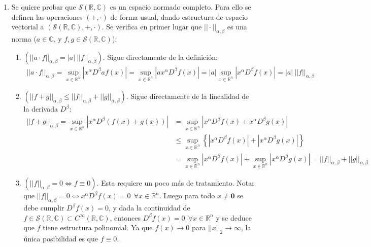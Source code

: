 \documentclass[spanish, fleqn]{article}
\begin{document}
\begin{description}
\begin{enumerate}
		\item Se quiere probar que $\mathcal{S}(\mathbb{R},\mathbb{C})$ es un espacio normado completo. Para ello se definen las operaciones $(+,\cdot)$ de forma usual, dando estructura de espacio vectorial a $\displaystyle \left(\mathcal{S}(\mathbb{R},\mathbb{C}),+,\cdot \right)$. Se verifica en primer lugar que $||\cdot||_{\alpha,\beta}$ es una norma ($a \in \mathbb{C}$, y $f,g \in \mathcal{S}(\mathbb{R},\mathbb{C})$): 
		\begin{enumerate}
			\item $\left( ||a \cdot f||_{\alpha,\beta} = |a| \ ||f||_{\alpha,\beta} \right)$. Sigue directamente de la definición:
			\begin{align*}
				||a \cdot f||_{\alpha,\beta} = \sup_{x \in \mathbb{R}^n} \left| x^{\alpha} D^{\beta} a f(x) \right| = \sup_{x \in \mathbb{R}^n} \left| a x^{\alpha} D^{\beta} f(x) \right| = |a| \sup_{x \in \mathbb{R}^n} \left| x^{\alpha} D^{\beta} f(x) \right| = |a| \ ||f||_{\alpha,\beta} 
			\end{align*}
			\item $\left( ||f+g||_{\alpha,\beta} \leq ||f||_{\alpha,\beta} + ||g||_{\alpha,\beta }\right)$. Sigue directamente de la linealidad de la derivada $D^{\beta}$:
			\begin{align*}
				 ||f+g||_{\alpha,\beta} =  \sup_{x \in \mathbb{R}^n} \left| x^{\alpha} D^{\beta}\left( f(x)+g(x) \right) \right| &= \sup_{x \in \mathbb{R}^n} \left| x^{\alpha} D^{\beta} f(x) +  x^{\alpha} D^{\beta} g(x) \right| \\ &\leq \sup_{x \in \mathbb{R}^n} \left\{ \left| x^{\alpha} D^{\beta} f(x) \right| +  \left|  x^{\alpha} D^{\beta} g(x) \right| \right\}\\ &= \sup_{x \in \mathbb{R}^n}  \left| x^{\alpha} D^{\beta} f(x) \right| + \sup_{x \in \mathbb{R}^n}  \left|  x^{\alpha} D^{\beta} g(x) \right| = ||f||_{\alpha,\beta} + ||g||_{\alpha,\beta }
			\end{align*}
			\item $\left( ||f||_{\alpha,\beta}=0 \Leftrightarrow f \equiv 0 \right)$. Esta requiere un poco más de tratamiento. Notar que $||f||_{\alpha,\beta}=0 \Leftrightarrow x^{\alpha}D^{\beta} f(x) = 0 \ \ \forall x \in \mathbb{R}^n$. Luego para todo $x \neq \mathbf{0}$ se debe cumplir $D^{\beta} f(x)=0$, y dada la continuidad de $f \in \mathcal{S}(\mathbb{R},\mathbb{C}) \subset C^{\infty}(\mathbb{R},\mathbb{C})$, entonces $D^{\beta} f(x)=0 \ \ \forall x \in \mathbb{R}^n$ y se deduce que $f$ tiene estructura polinomial. Ya que $f(x)\rightarrow 0$ para $||x||_2 \rightarrow \infty$, la única posibilidad es que $f \equiv 0$.
		\end{enumerate}


\end{enumerate}
\end{description}
\end{document}
